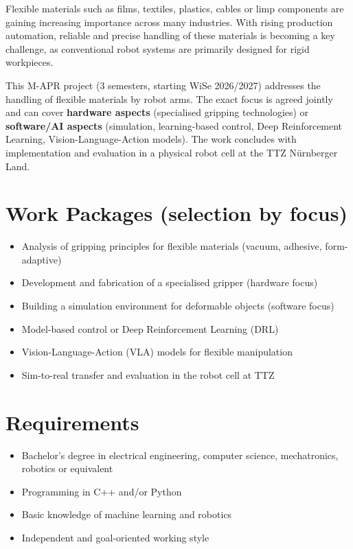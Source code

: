 \documentclass{ohm_project_description}
\begin{document}
\maketitle
\thispagestyle{fancy}

Flexible materials such as films, textiles, plastics, cables or limp components are gaining increasing importance across many industries. With rising production automation, reliable and precise handling of these materials is becoming a key challenge, as conventional robot systems are primarily designed for rigid workpieces.

This M-APR project (3 semesters, starting WiSe 2026/2027) addresses the handling of flexible materials by robot arms. The exact focus is agreed jointly and can cover \textbf{hardware aspects} (specialised gripping technologies) or \textbf{software/AI aspects} (simulation, learning-based control, Deep Reinforcement Learning, Vision-Language-Action models). The work concludes with implementation and evaluation in a physical robot cell at the TTZ Nürnberger Land.

\section*{Work Packages (selection by focus)}
\begin{itemize}[leftmargin=0.5cm]
    \setlength\itemsep{.1em}
    \item Analysis of gripping principles for flexible materials (vacuum, adhesive, form-adaptive)
    \item Development and fabrication of a specialised gripper (hardware focus)
    \item Building a simulation environment for deformable objects (software focus)
    \item Model-based control or Deep Reinforcement Learning (DRL)
    \item Vision-Language-Action (VLA) models for flexible manipulation
    \item Sim-to-real transfer and evaluation in the robot cell at TTZ
\end{itemize}

\section*{Requirements}
\begin{itemize}[leftmargin=0.5cm]
    \setlength\itemsep{.1em}
    \item Bachelor's degree in electrical engineering, computer science, mechatronics, robotics or equivalent
    \item Programming in C++ and/or Python
    \item Basic knowledge of machine learning and robotics
    \item Independent and goal-oriented working style
\end{itemize}
\end{document}
